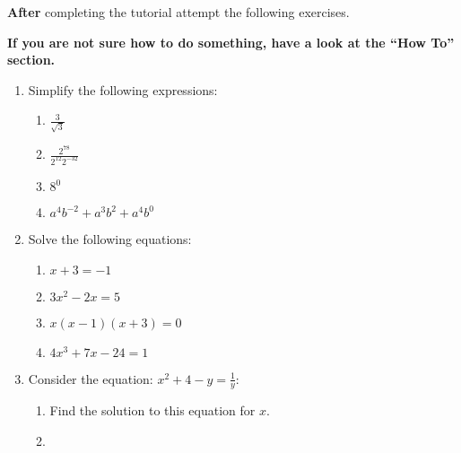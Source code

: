\begin{pyin}
\textbf{After} completing the tutorial attempt the following exercises.


\textbf{If you are not sure how to do something, have a look at the “How To” section.}
\begin{enumerate}

\item 

Simplify the following expressions:
\begin{enumerate}

\item 

\(\frac{3}{\sqrt{3}}\)

\item 

\(\frac{2 ^ {78}}{2 ^ {12}2^{-32}}\)

\item 

\(8^0\)

\item 

\(a^4b^{-2}+a^{3}b^{2}+a^{4}b^0\)

\end{enumerate}

\item 

Solve the following equations:
\begin{enumerate}

\item 

\(x + 3 = -1\)

\item 

\(3 x ^ 2 - 2 x = 5\)

\item 

\(x (x - 1) (x + 3) = 0\)

\item 

\(4 x ^3 + 7x - 24 = 1\)

\end{enumerate}

\item 

Consider the equation: \(x ^ 2 + 4 - y = \frac{1}{y}\):
\begin{enumerate}

\item 

Find the solution to this equation for \(x\).

\item 


\end{enumerate}
\end{enumerate}
\end{pyin}
